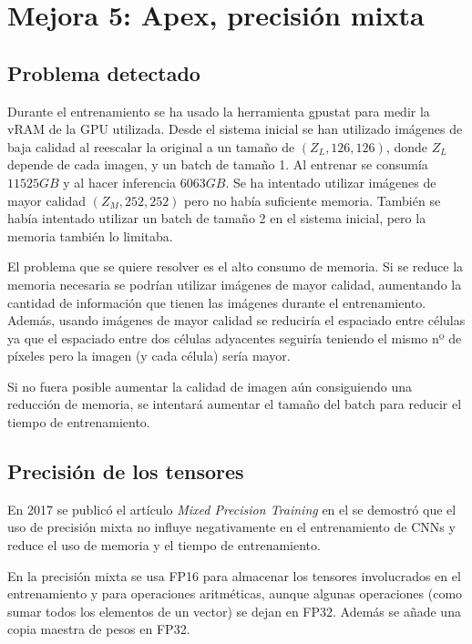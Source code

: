 \chapter{Mejora 5: Apex, precisión mixta}\label{apex}

\section{Problema detectado}\label{sec:apex_problem}

Durante el entrenamiento se ha usado la herramienta gpustat \cite{wookayin} para medir la vRAM de la GPU utilizada. Desde el sistema inicial se han utilizado imágenes de baja calidad al reescalar la original a un tamaño de $(Z_L, 126, 126)$, donde $Z_L$ depende de cada imagen, y un batch de tamaño 1. Al entrenar se consumía $11525GB$ y al hacer inferencia $6063GB$. Se ha intentado utilizar imágenes de mayor calidad $(Z_M, 252, 252)$ pero no había suficiente memoria. También se había intentado utilizar un batch de tamaño 2 en el sistema inicial, pero la memoria también lo limitaba.

El problema que se quiere resolver es el alto consumo de memoria. Si se reduce la memoria necesaria se podrían utilizar imágenes de mayor calidad, aumentando la cantidad de información que tienen las imágenes durante el entrenamiento. Además, usando imágenes de mayor calidad se reduciría el espaciado entre células ya que el espaciado entre dos células adyacentes seguiría teniendo el mismo nº de píxeles pero la imagen (y cada célula) sería mayor.

Si no fuera posible aumentar la calidad de imagen aún consiguiendo una reducción de memoria, se intentará aumentar el tamaño del batch para reducir el tiempo de entrenamiento.

\section{Precisión de los tensores}\label{sec:apex_precision}

En 2017 se publicó el artículo \textit{Mixed Precision Training} en el se demostró que el uso de precisión mixta no influye negativamente en el entrenamiento de CNNs \cite{Micikevicius2018} y reduce el uso de memoria y el tiempo de entrenamiento.

En la precisión mixta se usa FP16 para almacenar los tensores involucrados en el entrenamiento y para operaciones aritméticas, aunque algunas operaciones (como sumar todos los elementos de un vector) se dejan en FP32. Además se añade una copia maestra de pesos en FP32.

